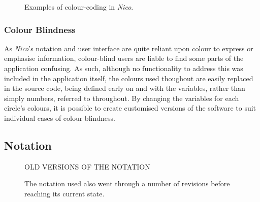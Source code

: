 \documentclass[12pt,twoside,notitlepage,xetex]{report}
\begin{document}
\begin{center}
\begin{figure}[H]
\begin{center}
{}\hspace{2cm}
\end{center}
\caption{Examples of colour-coding in \emph{Nico}.}
\label{fig:ColourCoding}
\end{figure}
\end{center}

\subsubsection{Colour Blindness}

As \emph{Nico}'s notation and user interface are quite reliant upon colour to express or emphasise information, colour-blind users are liable to find some parts of the application confusing.  As such, although no functionality to address this was included in the application itself, the colours used thoughout are easily replaced in the source code, being defined early on and with the variables, rather than simply numbers, referred to throughout.  By changing the variables for each circle's colours, it is possible to create customised versions of the software to suit individual cases of colour blindness. %

\subsection{Notation}%

\begin{center}
\begin{figure}[H]
\begin{center}
{\Huge \sfapp OLD VERSIONS OF THE NOTATION}
\end{center}
\caption{The notation used also went through a number of revisions before reaching its current state.}
\label{fig:OldNots}
\end{figure}
\end{center}
\end{document}

